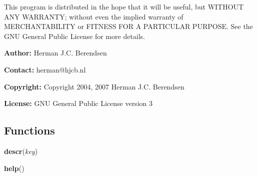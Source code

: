 This program is distributed in the hope that it will be useful, but WITHOUT
ANY WARRANTY; without even the implied warranty of MERCHANTABILITY or 
FITNESS FOR A PARTICULAR PURPOSE.  See the GNU General Public License for 
more details.

\textbf{Author:} Herman J.C. Berendsen



\textbf{Contact:} herman@hjcb.nl



\textbf{Copyright:} Copyright 2004, 2007 Herman J.C. Berendsen



\textbf{License:} GNU General Public License version 3





  \subsection{Functions}

    \label{SatStress:physcon:descr}

    \vspace{0.5ex}

\hspace{.8\funcindent}\begin{boxedminipage}{\funcwidth}

    \raggedright \textbf{descr}(\textit{key})

\setlength{\parskip}{2ex}
\setlength{\parskip}{1ex}
    \end{boxedminipage}

    \label{SatStress:physcon:help}

    \vspace{0.5ex}

\hspace{.8\funcindent}\begin{boxedminipage}{\funcwidth}

    \raggedright \textbf{help}()

\setlength{\parskip}{2ex}
\setlength{\parskip}{1ex}
    \end{boxedminipage}

